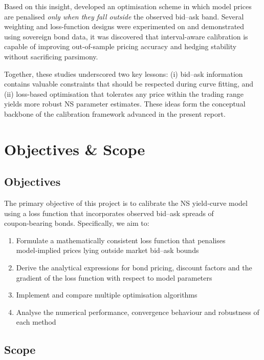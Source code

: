 \documentclass[12pt]{article}
\begin{document}
Based on this insight, \citet{LapshinSohatskaya2020} developed an optimisation scheme in which model prices are penalised {\em only when they fall outside} the observed bid–ask band.  
Several weighting and loss-function designs were experimented on and demonstrated using sovereign bond data, it was discovered that interval-aware calibration is capable of improving out-of-sample pricing accuracy and hedging stability without sacrificing parsimony.

Together, these studies underscored two key lessons:  
(i) bid–ask information contains valuable constraints that should be respected during curve fitting, and  
(ii) loss-based optimisation that tolerates any price within the trading range yields more robust NS parameter estimates.  
These ideas form the conceptual backbone of the calibration framework advanced in the present report.

\clearpage
\section{Objectives \& Scope}

\subsection{Objectives}

The primary objective of this project is to calibrate the NS yield‑curve model using a loss function that incorporates observed bid–ask spreads of coupon‑bearing bonds. Specifically, we aim to:

\begin{enumerate}
    \item Formulate a mathematically consistent loss function that penalises model‑implied prices lying outside market bid–ask bounds
    \item Derive the analytical expressions for bond pricing, discount factors and the gradient of the loss function with respect to model parameters
    \item Implement and compare multiple optimisation algorithms
    \item Analyse the numerical performance, convergence behaviour and robustness of each method
\end{enumerate}

\subsection{Scope}
\end{document}
